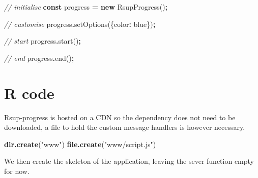 \documentclass[
]{krantz}
\makeatletter
\newenvironment{Shaded}{\begin{snugshade}}{\end{snugshade}}
\newcommand{\CommentTok}[1]{\textcolor[rgb]{0.37,0.37,0.37}{\textit{#1}}}
\newcommand{\DataTypeTok}[1]{\textcolor[rgb]{0.27,0.27,0.27}{#1}}
\newcommand{\FunctionTok}[1]{\textcolor[rgb]{0,0,0}{#1}}
\newcommand{\KeywordTok}[1]{\textcolor[rgb]{0.27,0.27,0.27}{\textbf{#1}}}
\newcommand{\NormalTok}[1]{#1}
\newcommand{\OperatorTok}[1]{\textcolor[rgb]{0.43,0.43,0.43}{\textbf{#1}}}
\newcommand{\StringTok}[1]{\textcolor[rgb]{0.5,0.5,0.5}{#1}}
\newenvironment{kframe}{%
\medskip{}
\setlength{\fboxsep}{.8em}
 \def\at@end@of@kframe{}%
 \ifinner\ifhmode%
  \def\at@end@of@kframe{\end{minipage}}%
  \begin{minipage}{\columnwidth}%
 \fi\fi%
 \def\FrameCommand##1{\hskip\@totalleftmargin \hskip-\fboxsep
 \colorbox{shadecolor}{##1}\hskip-\fboxsep
     \hskip-\linewidth \hskip-\@totalleftmargin \hskip\columnwidth}%
 \MakeFramed {\advance\hsize-\width
   \@totalleftmargin\z@ \linewidth\hsize
   \@setminipage}}%
 {\par\unskip\endMakeFramed%
 \at@end@of@kframe}
\renewenvironment{Shaded}{\begin{kframe}}{\end{kframe}}
\makeatother
\begin{document}
\begin{Shaded}
\begin{Highlighting}[]
\CommentTok{// initialise}
\KeywordTok{const}\NormalTok{ progress }\OperatorTok{=} \KeywordTok{new}\NormalTok{ RsupProgress()}\OperatorTok{;}

\CommentTok{// customise}
\NormalTok{progress}\OperatorTok{.}\FunctionTok{setOptions}\NormalTok{(\{}\DataTypeTok{color}\OperatorTok{:} \StringTok{\textquotesingle{}blue\textquotesingle{}}\NormalTok{\})}\OperatorTok{;}

\CommentTok{// start}
\NormalTok{progress}\OperatorTok{.}\FunctionTok{start}\NormalTok{()}\OperatorTok{;}

\CommentTok{// end}
\NormalTok{progress}\OperatorTok{.}\FunctionTok{end}\NormalTok{()}\OperatorTok{;}
\end{Highlighting}
\end{Shaded}

\hypertarget{r-code-1}{%
\section*{R code}\label{r-code-1}}


Rsup-progress is hosted on a CDN so the dependency does not need to be downloaded, a file to hold the custom message handlers is however necessary.

\begin{Shaded}
\begin{Highlighting}[]
\KeywordTok{dir.create}\NormalTok{(}\StringTok{"www"}\NormalTok{)}
\KeywordTok{file.create}\NormalTok{(}\StringTok{"www/script.js"}\NormalTok{)}
\end{Highlighting}
\end{Shaded}

We then create the skeleton of the application, leaving the sever function empty for now.
\end{document}
